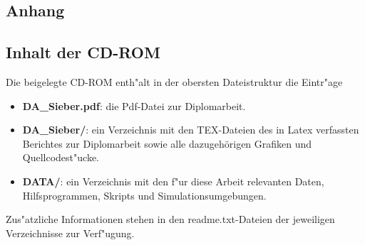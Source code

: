 %
%
\begin{appendix}
\chapter*{Anhang}
\setcounter{chapter}{1} %

\newpage
\section{Inhalt der CD-ROM}
Die beigelegte CD-ROM enth"alt in der obersten Dateistruktur die Eintr"age

\begin{itemize}
\item \textbf{DA\_Sieber.pdf}: die Pdf-Datei zur Diplomarbeit.
%
\item \textbf{DA\_Sieber/}: ein Verzeichnis mit den TEX-Dateien des in
Latex verfassten Berichtes zur Diplomarbeit sowie alle
dazugeh\"origen Grafiken und Quellcodest"ucke.
% 
\item \textbf{DATA/}: ein Verzeichnis mit den f"ur diese Arbeit
relevanten Daten, Hilfsprogrammen, Skripts und Simulationsumgebungen.
%
\end{itemize} 

Zus"atzliche Informationen stehen in den readme.txt-Dateien der
jeweiligen Verzeichnisse zur Verf"ugung.

\end{appendix}